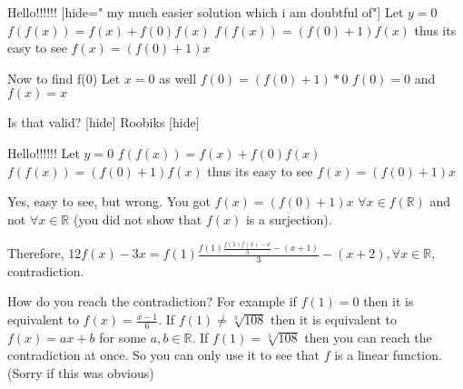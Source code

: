 \begin{solution}
	Hello!!!!!!
[hide=" my much easier solution which i am doubtful of"]
Let $ y=0$
$ f(f(x))=f(x)+f(0)f(x)$
$ f(f(x))=(f(0)+1)f(x)$
thus its easy to see
$ f(x)=(f(0)+1)x$

Now to find f(0)
Let $ x=0$ as well
$ f(0)=(f(0)+1)*0$
$ f(0)=0$ and $ f(x)=x$

Is that valid?
[\/hide]
Roobiks
[\/hide]
\end{solution}



\begin{solution}
	\begin{tcolorbox}Hello!!!!!!
Let $ y = 0$
$ f(f(x)) = f(x) + f(0)f(x)$
$ f(f(x)) = (f(0) + 1)f(x)$
thus its easy to see
$ f(x) = (f(0) + 1)x$
\end{tcolorbox}

Yes, easy to see, but wrong. You got $ f(x) = (f(0) + 1)x$  $ \forall x\in f(\mathbb R)$ and not $ \forall x\in\mathbb R$ (you did not show that $ f(x)$ is a surjection).
\end{solution}



\begin{solution}
	\begin{tcolorbox}Therefore, $ 12f(x) - 3x = f(1)\frac {f(1)\frac {f(1)f(x) - x}{3} - (x + 1)}{3} - (x + 2),\forall x\in\mathbb{R}$, contradiction.\end{tcolorbox}
How do you reach the contradiction? For example if $ f(1) = 0$ then it is equivalent to $ f(x) = \frac {x - 1}{6}$. If $ f(1) \neq \sqrt [3]{108}$ then it is equivalent to $ f(x) = ax + b$ for some $ a,b \in \mathbb{R}$. If $ f(1) = \sqrt [3]{108}$ then you can reach the contradiction at once. So you can only use it to see that $ f$ is a linear function. (Sorry if this was obvious)
\end{solution}



